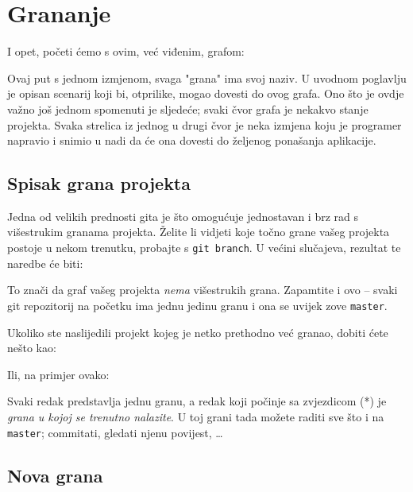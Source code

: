 \chapter*{Grananje}

I opet, početi ćemo s ovim, već viđenim, grafom:



Ovaj put s jednom izmjenom, svaga "grana" ima svoj naziv.
U uvodnom poglavlju je opisan scenarij koji bi, otprilike, mogao dovesti do ovog grafa.
Ono što je ovdje važno još jednom spomenuti je sljedeće; svaki čvor grafa je nekakvo stanje projekta. 
Svaka strelica iz jednog u drugi čvor je neka izmjena koju je programer napravio i snimio u nadi da će ona dovesti do željenog ponašanja aplikacije.

\section*{Spisak grana projekta}

Jedna od velikih prednosti gita je što omogućuje jednostavan i brz rad s višestrukim granama projekta.
Želite li vidjeti koje točno grane vašeg projekta postoje u nekom trenutku, probajte s \verb+git branch+.
U većini slučajeva, rezultat te naredbe će biti:



To znači da graf vašeg projekta \emph{nema} višestrukih grana. 
Zapamtite i ovo -- svaki git repozitorij na početku ima jednu jedinu granu i ona se uvijek zove \verb+master+.

Ukoliko ste naslijedili projekt kojeg je netko prethodno već granao, dobiti ćete nešto kao:



Ili, na primjer ovako:



Svaki redak predstavlja jednu granu, a redak koji počinje sa zvjezdicom (*) je \emph{grana u kojoj se trenutno nalazite}.
U toj grani tada možete raditi sve što i na \verb+master+; commitati, gledati njenu povijest, \dots

\section*{Nova grana}

